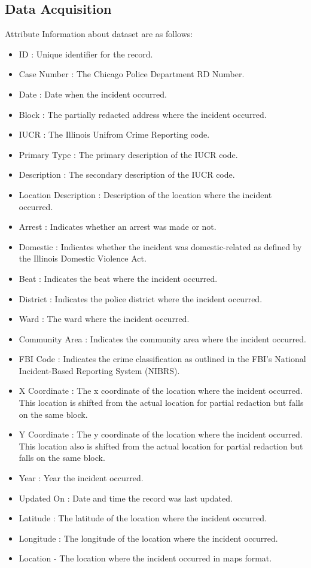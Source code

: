 \subsection{Data Acquisition}



Attribute Information about dataset are as follows:
\begin{itemize}
	\item ID : Unique identifier for the record.
	\item Case Number : The Chicago Police Department RD Number.
	\item Date : Date when the incident occurred.
	\item Block : The partially redacted address where the incident occurred.
	\item IUCR : The Illinois Unifrom Crime Reporting code. 
	\item Primary Type : The primary description of the IUCR code.
	\item Description : The secondary description of the IUCR code.
	\item Location Description : Description of the location where the incident occurred.
	\item Arrest : Indicates whether an arrest was made or not.
	\item Domestic : Indicates whether the incident was domestic-related as defined by the Illinois Domestic Violence Act.
	\item Beat : Indicates the beat where the incident occurred.
	\item District : Indicates the police district where the incident occurred.
	\item Ward : The ward where the incident occurred.
	\item Community Area : Indicates the community area where the incident occurred.
	\item FBI Code : Indicates the crime classification as outlined in the FBI's National Incident-Based Reporting System (NIBRS).
	\item X Coordinate : The x coordinate of the location where the incident occurred. This location is shifted from the actual location for partial redaction but falls on the same block.
	\item Y Coordinate : The y coordinate of the location where the incident occurred. This location also is shifted from the actual location for partial redaction but falls on the same block.
	\item Year : Year the incident occurred.
	\item Updated On : Date and time the record was last updated.
	\item Latitude : The latitude of the location where the incident occurred.
	\item Longitude : The longitude of the location where the incident occurred. 
	\item Location - The location where the incident occurred in maps format.
\end{itemize}

